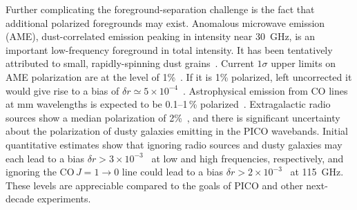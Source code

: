 \documentclass[PICOReport.tex]{subfiles}
\begin{document}

Further complicating the foreground-separation challenge is the fact that additional polarized foregrounds may exist.  
Anomalous microwave emission (AME), dust-correlated emission peaking in intensity near 30~GHz, is an important low-frequency foreground in total intensity. 
It has been tentatively attributed to small, rapidly-spinning dust grains~\citep{dickinson/etal:2018}. Current $1\sigma$ upper limits on AME polarization are at the level of 1\%~\citep{dickinson2018}. If it is 1\% 
polarized, left uncorrected it would give rise to a bias of $\delta r \simeq 5\times10^{-4}$~\citep{remazeilles2016}.  Astrophysical emission from CO lines at mm wavelengths is expected to be 0.1--1\,\% polarized~\citep{greeves1999, puglisi2017}.  Extragalactic radio sources show a median polarization of 2\%~\citep{Bonavera2018, puglisi2018_polsource, trombetti2018_fracpol}, and there is significant uncertainty about the polarization of dusty galaxies emitting in the PICO wavebands. Initial quantitative estimates show that ignoring radio sources and dusty galaxies may each lead to a bias $\delta r > 3\times10^{-3}$~\citep{toffolatti2012,Bonavera2018,remazeilles2018}  %
at low and high frequencies, respectively, and ignoring the CO\,$J=1\rightarrow0$ line could lead to a bias $\delta r > 2\times10^{-3}$~\citep{puglisi2017} at 115~GHz. %
These levels are appreciable compared to the goals of PICO and other next-decade experiments. 
\end{document}
